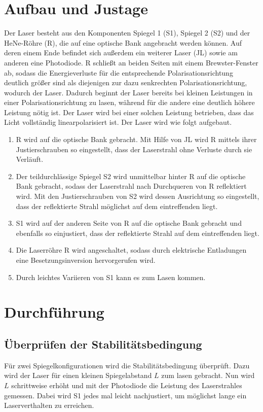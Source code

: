 \section{Aufbau und Justage}
Der Laser besteht aus den Komponenten Spiegel 1 (S1), Spiegel 2 (S2) und der 
HeNe-Röhre (R), die auf eine optische Bank angebracht werden können. Auf deren 
einem Ende befindet sich außerdem ein weiterer Laser (JL) sowie am anderen eine 
Photodiode. R schließt an beiden Seiten mit einem Brewster-Fenster ab, sodass die Energieverluste für die entsprechende Polarisationsrichtung deutlich größer sind als diejenigen zur dazu senkrechten Polarisationsrichtung, wodurch der Laser. Dadurch beginnt der Laser bereits bei kleinen Leistungen  in einer Polarisationsrichtung zu lasen, während für die andere eine deutlich höhere Leistung nötig ist. Der Laser wird bei einer solchen Leistung betrieben, dass das Licht vollständig linearpolarisiert ist. Der Laser wird wie folgt aufgebaut.
\begin{enumerate}
\item R wird auf die optische Bank gebracht. Mit Hilfe von JL wird R mittels 
ihrer Justierschrauben so eingestellt, dass der Laserstrahl ohne Verluste 
durch sie Verläuft.
\item Der teildurchlässige Spiegel S2 wird unmittelbar hinter R auf die 
optische Bank gebracht, sodass der Laserstrahl nach Durchqueren von R 
reflektiert wird. Mit den Justierschrauben von S2 wird dessen Ausrichtung so 
eingestellt, dass der reflektierte Strahl möglichst auf dem eintreffenden 
liegt.
\item S1 wird auf der anderen Seite von R auf die optische Bank gebracht und
ebenfalls so einjustiert, dass der reflektierte Strahl auf dem eintreffenden 
liegt.
\item Die Laserröhre R wird angeschaltet, sodass durch elektrische Entladungen 
eine Besetzungsinversion hervorgerufen wird. 
\item Durch leichtes Variieren von S1 kann es zum Lasen kommen.
\end{enumerate}

\section{Durchführung}
\subsection{Überprüfen der Stabilitätsbedingung}
Für zwei Spiegelkonfigurationen wird die Stabilitätsbedingung überprüft. Dazu 
wird der Laser für einen kleinen Spiegelabstand $L$ zum lasen gebracht. Nun 
wird $L$ schrittweise erhöht und mit der Photodiode die Leistung des 
Laserstrahles gemessen. Dabei wird S1 jedes mal leicht nachjustiert, um 
möglichst lange ein Laserverthalten zu erreichen.
